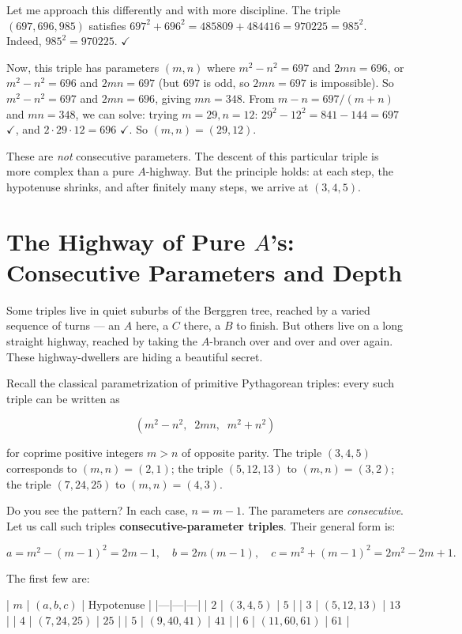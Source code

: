 \documentclass[11pt,twoside,openright]{book}
\theoremstyle{definition}
\theoremstyle{remark}
\begin{document}
Let me approach this differently and with more discipline. The triple $(697, 696, 985)$ satisfies $697^2 + 696^2 = 485809 + 484416 = 970225 = 985^2$. Indeed, $985^2 = 970225$. $\checkmark$

Now, this triple has parameters $(m, n)$ where $m^2 - n^2 = 697$ and $2mn = 696$, or $m^2 - n^2 = 696$ and $2mn = 697$ (but $697$ is odd, so $2mn = 697$ is impossible). So $m^2 - n^2 = 697$ and $2mn = 696$, giving $mn = 348$. From $m - n = 697/(m+n)$ and $mn = 348$, we can solve: trying $m = 29, n = 12$: $29^2 - 12^2 = 841 - 144 = 697$ $\checkmark$, and $2 \cdot 29 \cdot 12 = 696$ $\checkmark$. So $(m, n) = (29, 12)$.

These are \textit{not} consecutive parameters. The descent of this particular triple is more complex than a pure $A$-highway. But the principle holds: at each step, the hypotenuse shrinks, and after finitely many steps, we arrive at $(3, 4, 5)$.



\section{The Highway of Pure $A$'s: Consecutive Parameters and Depth}

Some triples live in quiet suburbs of the Berggren tree, reached by a varied sequence of turns --- an $A$ here, a $C$ there, a $B$ to finish. But others live on a long straight highway, reached by taking the $A$-branch over and over and over again. These highway-dwellers are hiding a beautiful secret.

Recall the classical parametrization of primitive Pythagorean triples: every such triple can be written as

\[(m^2 - n^2,\;\; 2mn,\;\; m^2 + n^2)\]

for coprime positive integers $m > n$ of opposite parity. The triple $(3, 4, 5)$ corresponds to $(m, n) = (2, 1)$; the triple $(5, 12, 13)$ to $(m, n) = (3, 2)$; the triple $(7, 24, 25)$ to $(m, n) = (4, 3)$.

Do you see the pattern? In each case, $n = m - 1$. The parameters are \textit{consecutive}. Let us call such triples \textbf{consecutive-parameter triples}. Their general form is:

\[a = m^2 - (m-1)^2 = 2m - 1, \quad b = 2m(m-1), \quad c = m^2 + (m-1)^2 = 2m^2 - 2m + 1.\]

The first few are:

| $m$ | $(a, b, c)$ | Hypotenuse |
|---|---|---|
| $2$ | $(3, 4, 5)$ | $5$ |
| $3$ | $(5, 12, 13)$ | $13$ |
| $4$ | $(7, 24, 25)$ | $25$ |
| $5$ | $(9, 40, 41)$ | $41$ |
| $6$ | $(11, 60, 61)$ | $61$ |
\end{document}
